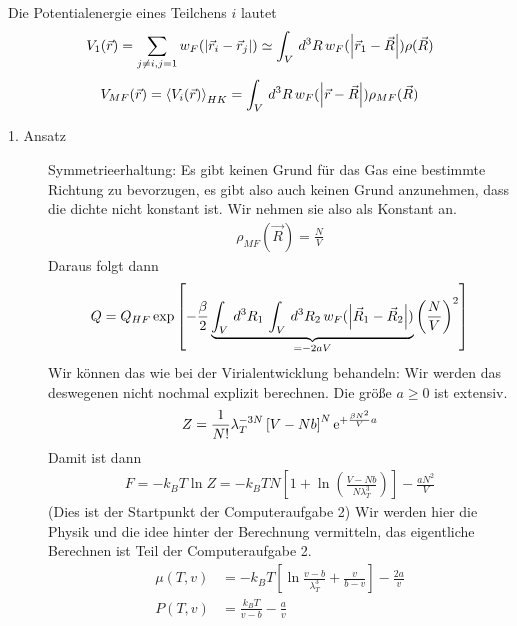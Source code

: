 Die Potentialenergie eines Teilchens $i$ lautet
%
\begin{align*}
  V_1 (\vec{r}) = \sum_{j \neq i, j = 1}^{}w_F (\left| \vec{r}_i - \vec{r}_j \right|)
  \simeq \int_{V}^{} \,d^3 R\,w_F (\left| \vec{r}_1 - \vec{R} \right|) \rho(\vec{R})
\end{align*}
%
%
\begin{align*}
  V_{MF}(\vec{r}) = \Braket{V_i(\vec{r})}_{HK} = 
  \int_{V}^{} \,d^3 R \, w_F (\left| \vec{r} - \vec{R} \right|) \rho_{MF} (\vec{R})
\end{align*}
%
\begin{description}
  \item[1. Ansatz] Symmetrieerhaltung: Es gibt keinen Grund f\"ur das Gas
    eine bestimmte Richtung zu bevorzugen, es gibt also auch keinen Grund
    anzunehmen, dass die dichte nicht konstant ist. Wir nehmen sie also als
    Konstant an.
    \begin{align*}
      \rho_{MF}(\vec{R}) = \frac{N}{V}
    \end{align*}
    Daraus folgt dann
    \begin{align*}
      Q = Q_{HF} \exp \left[ - \frac{\beta}{2} \underbrace{\int_{V}^{} \,d^3 R_1\, \int_{V}^{} \,d^3 R_2\,
      w_F (\left| \vec{R}_1 - \vec{R}_2 \right|)}_{= - 2 a V}\left( \frac{N}{V} \right)^2\right]
    \end{align*}
    Wir k\"onnen das wie bei der Virialentwicklung behandeln: Wir werden das
    deswegenen nicht nochmal explizit berechnen. Die gr\"o\ss{}e $a \ge 0 $ ist
    extensiv.
    \begin{align*}
      Z = \frac{1}{N!} \lambda_T ^{-3N} \left[ V - Nb \right]^N
      \mathrm{e}^{+ \frac{\beta N^2}{V} a}
    \end{align*}
    Damit ist dann
    \begin{align*}
      F = - k_B T \ln{Z} = - k_B T N \left[ 1 + \ln{\left( 
      \frac{V - Nb}{N \lambda_T ^{3}}\right)} \right] - \frac{a N^2 }{V}
    \end{align*}
    (Dies ist der Startpunkt der Computeraufgabe 2)
    Wir werden hier die Physik und die idee hinter der Berechnung vermitteln, 
    das eigentliche Berechnen ist Teil der Computeraufgabe 2.
    \begin{align*}
      \mu(T, v) &= - k_B T \left[ \ln{\frac{v-b}{\lambda_T^3}} + 
      \frac{v}{b - v}\right] - \frac{2a}{v} \\
      P(T, v) & = \frac{k_B T }{v - b} - \frac{a}{v}
    \end{align*}

\end{description}
